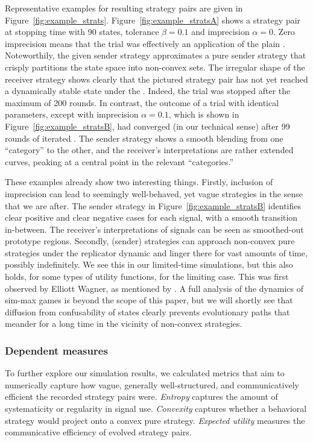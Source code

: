 \documentclass[fleqn,reqno,10pt]{article}
\newcommand{\rd}{\acro{rd}} %
\newcommand{\rdd}{\acro{rdd}} %
\newcommand{\impairment}{\ensuremath{\alpha}} %
\newcommand{\toler}{\ensuremath{\beta}} %
\begin{document}
Representative examples for resulting strategy pairs are given in
Figure~\ref{fig:example_strats}. Figure~\ref{fig:example_stratsA}
shows a strategy pair at stopping time with 90 states, tolerance
$\toler = 0.1$ and imprecision $\impairment = 0$. Zero imprecision
means that the trial was effectively an application of the plain
\rd. Noteworthily, the given sender strategy approximates a pure
sender strategy that crisply partitions the state space into
non-convex sets. The irregular shape of the receiver strategy shows
clearly that the pictured strategy pair has not yet reached a
dynamically stable state under the \rd. Indeed, the trial was stopped
after the maximum of 200 rounds. In contrast, the outcome of a trial
with identical parameters, except with imprecision $\impairment =
0.1$, which is shown in Figure~\ref{fig:example_stratsB}, had
converged (in our technical sense) after 99 rounds of iterated
\rdd. The sender strategy shows a smooth blending from one
``category'' to the other, and the receiver's interpretations are
rather extended curves, peaking at a central point in the relevant
``categories.''

These examples already show two interesting things. Firstly, inclusion
of imprecision can lead to seemingly well-behaved, yet vague
strategies in the sense that we are after. The sender strategy in
Figure~\ref{fig:example_stratsB} identifies clear positive and clear
negative cases for each signal, with a smooth transition
in-between. The receiver's interpretations of signals can be seen as
smoothed-out prototype regions. Secondly, (sender) strategies can
approach non-convex pure strategies under the replicator dynamic and
linger there for vast amounts of time, possibly indefinitely. We see
this in our limited-time simulations, but this also holds, for some
types of utility functions, for the limiting case. This was first
observed by Elliott Wagner, as mentioned by \citet{OConnor2014-OCOEPC}.
A full analysis of the dynamics of sim-max games is beyond the scope of this paper, but we
will shortly see that diffusion from confusability of states clearly
prevents evolutionary paths that meander for a long time in the
vicinity of non-convex strategies.



\subsubsection{Dependent measures}
 
To further explore our simulation results, we calculated metrics that
aim to numerically capture how vague, generally well-structured, and
communicatively efficient the recorded strategy pairs
were. \emph{Entropy} captures the amount of systematicity or
regularity in signal use. \emph{Convexity} captures whether a
behavioral strategy would project onto a convex pure
strategy. \emph{Expected utility} measures the communicative
efficiency of evolved strategy pairs.
\end{document}
